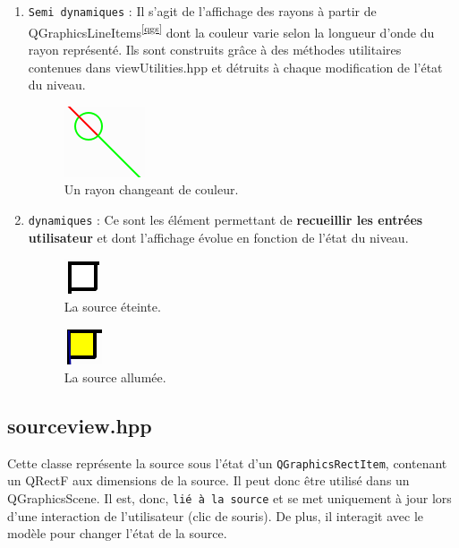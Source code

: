 \documentclass[a4paper,11pt]{report}
\begin{document}
\begin{enumerate}
	\item \texttt{Semi dynamiques} : 
		Il s'agit de l'affichage des rayons à partir de QGraphicsLineItems\textsuperscript{\ref{qgs}} dont la
		couleur varie selon la longueur d'onde du rayon représenté. Ils sont construits
		grâce à des méthodes utilitaires contenues dans viewUtilities.hpp et
		détruits à chaque modification de l'état du niveau. 

		\begin{figure}[h!]
			\caption{Un rayon changeant de couleur.}
			\centering
			\includegraphics[keepaspectratio=true,width=0.2\linewidth]{./screenshots/elements_semi_dyn/ray_change_color}
		\end{figure}

	\item \texttt{dynamiques} :
		Ce sont les élément permettant de \textbf{recueillir les entrées
		utilisateur} et dont l'affichage évolue en fonction de l'état du niveau.

		\begin{figure}[h!]
			\caption{La source éteinte.}
			\centering
			\includegraphics{./screenshots/elements_dyn/source_off}
		\end{figure}
		\begin{figure}[h!]
			\caption{La source allumée.}
			\centering
			\includegraphics{./screenshots/elements_dyn/source_on}
		\end{figure}
\end{enumerate}

\subsection[La source]{sourceview.hpp}
Cette classe représente la source sous l'état d'un \texttt{QGraphicsRectItem}, contenant
un QRectF aux dimensions de la source. Il peut donc être utilisé dans un 
QGraphicsScene. Il est, donc, \texttt{lié à la source} et se met uniquement à jour 
lors d'une interaction de l'utilisateur (clic de souris). De plus, il interagit
avec le modèle pour changer l'état de la source.
\end{document}
